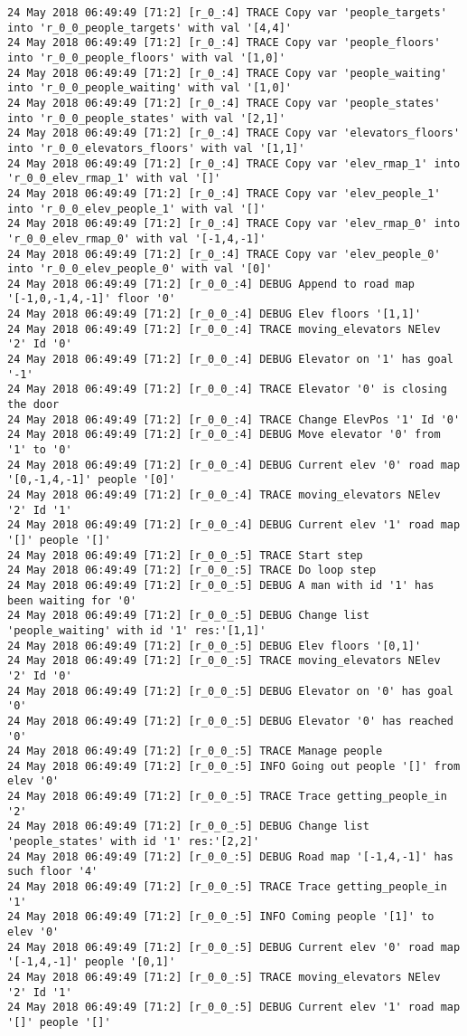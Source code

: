 \begin{lstlisting}[basicstyle=\scriptsize]
24 May 2018 06:49:49 [71:2] [r_0_:4] TRACE Copy var 'people_targets' into 'r_0_0_people_targets' with val '[4,4]'
24 May 2018 06:49:49 [71:2] [r_0_:4] TRACE Copy var 'people_floors' into 'r_0_0_people_floors' with val '[1,0]'
24 May 2018 06:49:49 [71:2] [r_0_:4] TRACE Copy var 'people_waiting' into 'r_0_0_people_waiting' with val '[1,0]'
24 May 2018 06:49:49 [71:2] [r_0_:4] TRACE Copy var 'people_states' into 'r_0_0_people_states' with val '[2,1]'
24 May 2018 06:49:49 [71:2] [r_0_:4] TRACE Copy var 'elevators_floors' into 'r_0_0_elevators_floors' with val '[1,1]'
24 May 2018 06:49:49 [71:2] [r_0_:4] TRACE Copy var 'elev_rmap_1' into 'r_0_0_elev_rmap_1' with val '[]'
24 May 2018 06:49:49 [71:2] [r_0_:4] TRACE Copy var 'elev_people_1' into 'r_0_0_elev_people_1' with val '[]'
24 May 2018 06:49:49 [71:2] [r_0_:4] TRACE Copy var 'elev_rmap_0' into 'r_0_0_elev_rmap_0' with val '[-1,4,-1]'
24 May 2018 06:49:49 [71:2] [r_0_:4] TRACE Copy var 'elev_people_0' into 'r_0_0_elev_people_0' with val '[0]'
24 May 2018 06:49:49 [71:2] [r_0_0_:4] DEBUG Append to road map '[-1,0,-1,4,-1]' floor '0'
24 May 2018 06:49:49 [71:2] [r_0_0_:4] DEBUG Elev floors '[1,1]'
24 May 2018 06:49:49 [71:2] [r_0_0_:4] TRACE moving_elevators NElev '2' Id '0'
24 May 2018 06:49:49 [71:2] [r_0_0_:4] DEBUG Elevator on '1' has goal '-1'
24 May 2018 06:49:49 [71:2] [r_0_0_:4] TRACE Elevator '0' is closing the door
24 May 2018 06:49:49 [71:2] [r_0_0_:4] TRACE Change ElevPos '1' Id '0'
24 May 2018 06:49:49 [71:2] [r_0_0_:4] DEBUG Move elevator '0' from '1' to '0'
24 May 2018 06:49:49 [71:2] [r_0_0_:4] DEBUG Current elev '0' road map '[0,-1,4,-1]' people '[0]'
24 May 2018 06:49:49 [71:2] [r_0_0_:4] TRACE moving_elevators NElev '2' Id '1'
24 May 2018 06:49:49 [71:2] [r_0_0_:4] DEBUG Current elev '1' road map '[]' people '[]'
24 May 2018 06:49:49 [71:2] [r_0_0_:5] TRACE Start step
24 May 2018 06:49:49 [71:2] [r_0_0_:5] TRACE Do loop step
24 May 2018 06:49:49 [71:2] [r_0_0_:5] DEBUG A man with id '1' has been waiting for '0'
24 May 2018 06:49:49 [71:2] [r_0_0_:5] DEBUG Change list 'people_waiting' with id '1' res:'[1,1]'
24 May 2018 06:49:49 [71:2] [r_0_0_:5] DEBUG Elev floors '[0,1]'
24 May 2018 06:49:49 [71:2] [r_0_0_:5] TRACE moving_elevators NElev '2' Id '0'
24 May 2018 06:49:49 [71:2] [r_0_0_:5] DEBUG Elevator on '0' has goal '0'
24 May 2018 06:49:49 [71:2] [r_0_0_:5] DEBUG Elevator '0' has reached '0'
24 May 2018 06:49:49 [71:2] [r_0_0_:5] TRACE Manage people
24 May 2018 06:49:49 [71:2] [r_0_0_:5] INFO Going out people '[]' from elev '0'
24 May 2018 06:49:49 [71:2] [r_0_0_:5] TRACE Trace getting_people_in '2'
24 May 2018 06:49:49 [71:2] [r_0_0_:5] DEBUG Change list 'people_states' with id '1' res:'[2,2]'
24 May 2018 06:49:49 [71:2] [r_0_0_:5] DEBUG Road map '[-1,4,-1]' has such floor '4'
24 May 2018 06:49:49 [71:2] [r_0_0_:5] TRACE Trace getting_people_in '1'
24 May 2018 06:49:49 [71:2] [r_0_0_:5] INFO Coming people '[1]' to elev '0'
24 May 2018 06:49:49 [71:2] [r_0_0_:5] DEBUG Current elev '0' road map '[-1,4,-1]' people '[0,1]'
24 May 2018 06:49:49 [71:2] [r_0_0_:5] TRACE moving_elevators NElev '2' Id '1'
24 May 2018 06:49:49 [71:2] [r_0_0_:5] DEBUG Current elev '1' road map '[]' people '[]'
\end{lstlisting}

